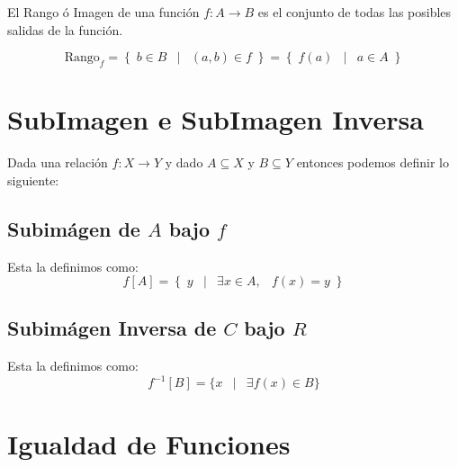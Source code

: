 \documentclass[12pt, fleqn]{report}                             %
\DeclareMathOperator \Space     {\quad}                         %
\DeclareMathOperator \MiniSpace {\;}                            %
\newcommand \Such           {\MiniSpace | \MiniSpace}           %
\theoremstyle{break}                                            %
\newcommand{\Set}[1]            {\left\{ \; #1 \; \right\}}     %
\begin{document}
                El Rango ó Imagen de una función $f : A \to B$ es el conjunto de todas las posibles salidas
                de la función.

                \begin{equation}
                    \text{Rango}_f = \Set{b \in B \Such (a,b) \in f} = \Set{ f(a) \Such a \in A}
                \end{equation}




        \clearpage
        \section{SubImagen e SubImagen Inversa}

            Dada una relación $f: X \to Y$ y dado $A \subseteq X$ y $B \subseteq Y$
            entonces podemos definir lo siguiente:

            \subsection*{Subimágen de $A$ bajo $f$}
                
                Esta la definimos como:
                \begin{equation*}
                    f[A] = \Set{ y \Such \exists x \in A, \MiniSpace f(x) = y }
                \end{equation*}


            \subsection*{Subimágen Inversa de $C$ bajo $R$}

                Esta la definimos como:
                \begin{equation*}
                    f^{-1}[B] = \{ x \Such \exists f(x) \in B\}
                \end{equation*}

        \section{Igualdad de Funciones}
\end{document}
